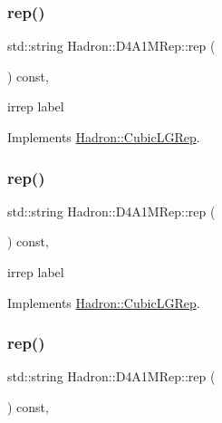 \subsubsection{\texorpdfstring{rep()}{rep()}\hspace{0.1cm}{\footnotesize\ttfamily [1/3]}}
{\footnotesize\ttfamily std\+::string Hadron\+::\+D4\+A1\+M\+Rep\+::rep (\begin{DoxyParamCaption}{ }\end{DoxyParamCaption}) const\hspace{0.3cm}{\ttfamily [inline]}, {\ttfamily [virtual]}}

irrep label 

Implements \mbox{\hyperlink{structHadron_1_1CubicLGRep_a50f5ddbb8f4be4cee0106fa9e8c75e6c}{Hadron\+::\+Cubic\+L\+G\+Rep}}.

\mbox{\label{structHadron_1_1D4A1MRep_adbca586cc67ec998e597be4d2e251c8d}} 
\subsubsection{\texorpdfstring{rep()}{rep()}\hspace{0.1cm}{\footnotesize\ttfamily [2/3]}}
{\footnotesize\ttfamily std\+::string Hadron\+::\+D4\+A1\+M\+Rep\+::rep (\begin{DoxyParamCaption}{ }\end{DoxyParamCaption}) const\hspace{0.3cm}{\ttfamily [inline]}, {\ttfamily [virtual]}}

irrep label 

Implements \mbox{\hyperlink{structHadron_1_1CubicLGRep_a50f5ddbb8f4be4cee0106fa9e8c75e6c}{Hadron\+::\+Cubic\+L\+G\+Rep}}.

\mbox{\label{structHadron_1_1D4A1MRep_adbca586cc67ec998e597be4d2e251c8d}} 
\subsubsection{\texorpdfstring{rep()}{rep()}\hspace{0.1cm}{\footnotesize\ttfamily [3/3]}}
{\footnotesize\ttfamily std\+::string Hadron\+::\+D4\+A1\+M\+Rep\+::rep (\begin{DoxyParamCaption}{ }\end{DoxyParamCaption}) const\hspace{0.3cm}{\ttfamily [inline]}, {\ttfamily [virtual]}}

